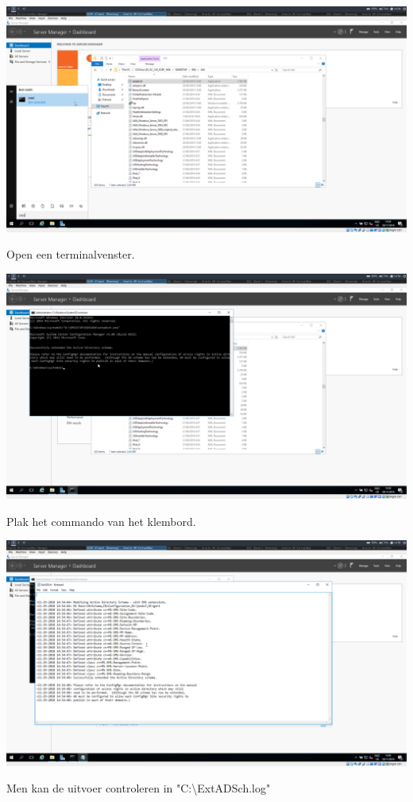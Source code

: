 \documentclass[a4paper]{article}
\begin{document}
\begin{center}
	\includegraphics[width=15cm]{Pictures/SCCM/2/1543499669.png}
	
	Open een terminalvenster.
\end{center}

\begin{center}
	\includegraphics[width=15cm]{Pictures/SCCM/2/1543499693.png}
	
	Plak het commando van het klembord.
\end{center}

\begin{center}
	\includegraphics[width=15cm]{Pictures/SCCM/2/1543499769.png}
	
	Men kan de uitvoer controleren in "C:\textbackslash ExtADSch.log"
\end{center}
\end{document}
